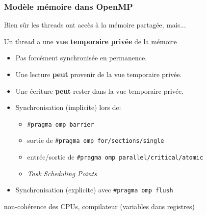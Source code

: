 \documentclass[xcolor={x11names,svgnames}]{beamer}
\begin{document}

\begin{frame}[label=omp_memory_model]
\frametitle{Modèle mémoire dans OpenMP}


Bien sûr les threads ont accès à la mémoire partagée, mais...


\begin{alertblock}{Un thread a une \textbf{vue temporaire privée} de la mémoire}
  \begin{itemize}
  \item Pas forcément synchronisée en permanence.

  \item Une lecture \textbf{peut} provenir de la vue temporaire privée.
    
  \item Une écriture \textbf{peut} rester dans la vue temporaire privée.

  \item Synchronisation (implicite) lors de:
    \begin{itemize}
    \item \texttt{\#pragma omp barrier}
    \item sortie de \texttt{\#pragma omp for/sections/single}
    \item entrée/sortie de \texttt{\#pragma omp parallel/critical/atomic}
    \item \emph{Task Scheduling Points}
    \end{itemize}

  \item Synchronisation (explicite) avec \texttt{\#pragma omp flush}
  \end{itemize}
\end{alertblock}

non-cohérence des CPUs, compilateur (variables dans registres)

\end{frame}
\end{document}
